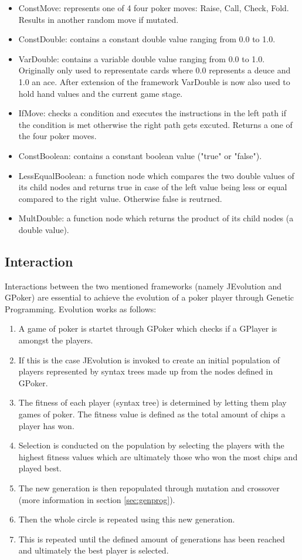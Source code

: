 \documentclass[12pt,fleqn,a4paper]{article}
\begin{document}
\begin{itemize}
	\item ConstMove: represents one of 4 four poker moves: Raise, Call, Check, Fold. Results in another random
	move if mutated.
	\item ConstDouble: contains a constant double value ranging from 0.0 to 1.0.
	\item VarDouble: contains a variable double value ranging from 0.0 to 1.0. Originally only used to representate
	cards where 0.0 represents a deuce and 1.0 an ace. After extension of the framework VarDouble is now also used to
	hold hand values and the current game stage.
	\item IfMove: checks a condition and executes the instructions in the left path if the condition is met otherwise the 
	right path gets excuted. Returns a one of the four poker moves.
	\item ConstBoolean: contains a constant boolean value ("true" or "false").
	\item LessEqualBoolean: a function node which compares the two double values of its child nodes and returns true in case of the left value being less or equal compared to the right value. Otherwise false is reutrned.
	\item MultDouble: a function node which returns the product of its child nodes (a double value).
\end{itemize}

\subsection{Interaction}
Interactions between the two mentioned frameworks (namely JEvolution and GPoker) are essential to achieve the evolution of a poker player through Genetic Programming. Evolution works as follows:
\label{sec:nodes}
\begin{enumerate}
	\item A game of poker is startet through GPoker which checks if a GPlayer is amongst the players.
	\item If this is the case JEvolution is invoked to create an initial population of players represented by syntax trees
	made up from the nodes defined in GPoker.
	\item The fitness of each player (syntax tree) is determined by letting them play games of poker. The fitness value is defined as the total amount of chips a player has won.
	\item Selection is conducted on the population by selecting the players with the highest fitness values which are ultimately those who won the most chips and played best.
	\item The new generation is then repopulated through mutation and crossover (more information in section \ref{sec:genprog}).
	\item Then the whole circle is repeated using this new generation.
	\item This is repeated until the defined amount of generations has been reached and ultimately the best player is selected.
\end{enumerate}
\end{document}
